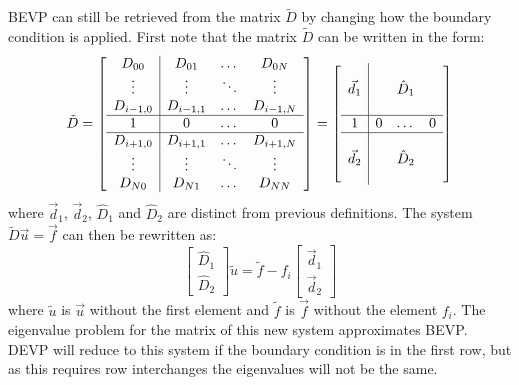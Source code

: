 \documentclass{sfuthesis}
\begin{document}
BEVP can still be retrieved from the matrix $\tilde{D}$ by changing how the boundary condition is applied.
First note that the matrix $\tilde{D}$ can be written in the form:
\begin{equation}
\tilde{D} = \left [ \begin{array}{c | c c c} D_{00} & D_{01} & \dots & D_{0N} \\
\vdots & \vdots & \ddots & \vdots \\
D_{i-1,0} & D_{i-1,1} & \dots & D_{i-1,N} \\ \hline
1 & 0 & \dots & 0 \\ \hline
D_{i+1,0} & D_{i+1,1} & \dots & D_{i+1,N} \\
\vdots & \vdots & \ddots & \vdots \\
D_{N0} & D_{N1} & \dots & D_{NN} \end{array} \right ] =
\left [ \begin{array}{c | c c c}  &  &  &  \\
\vec{d}_1 &  & \hat{D}_1 &  \\
 &  &  &  \\ \hline
1 & 0 & \dots & 0 \\ \hline
 &  &  &  \\
\vec{d}_2 &  & \hat{D}_2 &  \\
 &  &  &  \end{array} \right ]
\end{equation}
where $\vec{d}_1$, $\vec{d}_2$, $\hat{D}_1$ and $\hat{D}_2$ are distinct from previous definitions.
The system $\tilde{D} \vec{u} = \vec{f}$ can then be rewritten as:
\begin{equation}
\begin{bmatrix} \hat{D}_1 \\ \hat{D}_2 \end{bmatrix} \tilde{u} = \tilde{f} - f_i \begin{bmatrix} \vec{d}_1 \\ \vec{d}_2 \end{bmatrix}
\end{equation}
where $\tilde{u}$ is $\vec{u}$ without the first element and $\tilde{f}$ is $\vec{f}$ without the element $f_i$.
The eigenvalue problem for the matrix of this new system approximates BEVP.
DEVP will reduce to this system if the boundary condition is in the first row, but as this requires row interchanges the eigenvalues will not be the same.
\end{document}
